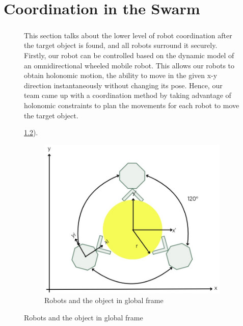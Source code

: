 \chapter{Coordination in the Swarm}

\begin{figure} [H]

\paragraph*{}
This section talks about the lower level of robot coordination after the target object is found, and all robots surround it securely. Firstly, our robot can be controlled based on the dynamic model of an omnidirectional wheeled mobile robot. This allows our robots to obtain holonomic motion, the ability to move in the given x-y direction instantaneously without changing its pose. Hence, our team came up with a coordination method by taking advantage of holonomic constraints to plan the movements for each robot to move the target object.

\ref{fig:coordination-diagram}).

\begin{figure} [H]
    \centering
    \includegraphics[width=0.5\linewidth]{assets/images/coordination/robots_with_object.jpg}
    \caption{Robots and the object in global frame}
    \label{fig:coordination-diagram}
\end{figure}


\end{figure}
